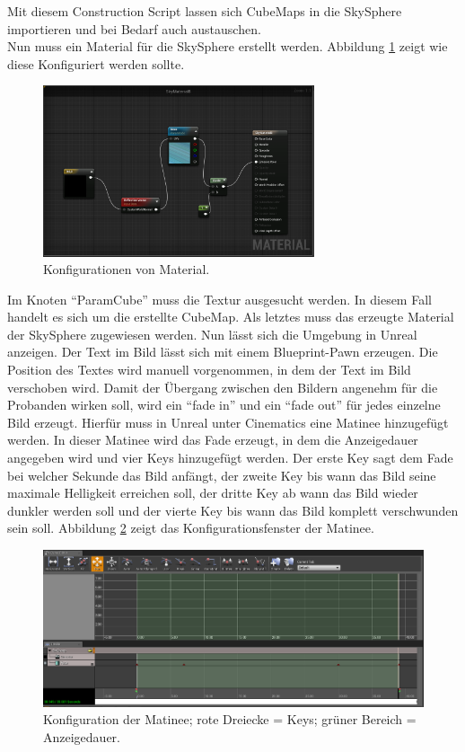 Mit diesem Construction Script lassen sich CubeMaps in die SkySphere importieren und bei Bedarf auch austauschen. \\

Nun muss ein Material für die SkySphere erstellt werden. Abbildung \ref{fig-konfiguration} zeigt wie diese Konfiguriert werden sollte. \\

\begin{figure}[H] \centering
\includegraphics[width=8cm]{Images/konfiguration.png} 
\caption{Konfigurationen von Material.}
\label{fig-konfiguration} 
\end{figure}


Im Knoten ``ParamCube'' muss die Textur ausgesucht werden. 
In diesem Fall handelt es sich um die erstellte CubeMap. 
Als letztes muss das erzeugte Material der SkySphere zugewiesen werden. 
Nun lässt sich die Umgebung in Unreal anzeigen.
Der Text im Bild lässt sich mit einem Blueprint-Pawn erzeugen. 
Die Position des Textes wird manuell vorgenommen, in dem der Text im Bild verschoben wird. 
Damit der Übergang zwischen den Bildern angenehm für die Probanden wirken soll, wird ein ``fade in'' und ein ``fade out'' für jedes einzelne Bild erzeugt. 
Hierfür muss in Unreal unter Cinematics eine Matinee hinzugefügt werden. 
In dieser Matinee wird das Fade erzeugt, in dem die Anzeigedauer angegeben wird und vier Keys hinzugefügt werden. 
Der erste Key sagt dem Fade bei welcher Sekunde das Bild anfängt, der zweite Key bis wann das Bild seine maximale Helligkeit erreichen soll, der dritte Key ab wann das Bild wieder dunkler werden soll und der vierte Key bis wann das Bild komplett verschwunden sein soll. 
Abbildung \ref{fig-matinee} zeigt das Konfigurationsfenster der Matinee. \\

\begin{figure}[H] \centering
\includegraphics[width=\textwidth]{Images/matinee.png} 
\caption[Konfiguration der Matinee]{Konfiguration der Matinee; rote Dreiecke = Keys; grüner Bereich = Anzeigedauer.}
\label{fig-matinee} 
\end{figure}


